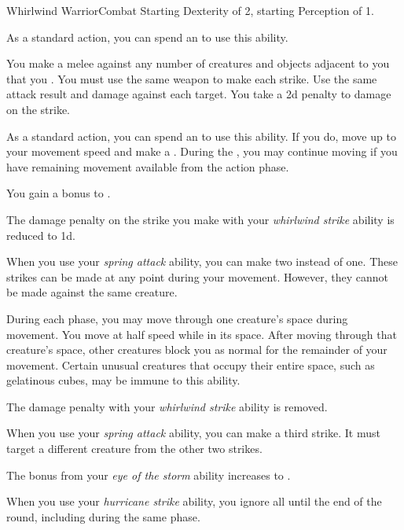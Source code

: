     \begin{feat}{Whirlwind Warrior}{Combat}
        \featpres Starting Dexterity of 2, starting Perception of 1.
        \featben

         As a standard action, you can spend an  to use this ability.
        \begin{ability}
            \begin{spelleffects}
                \spelleffect You make a melee  against any number of creatures and objects adjacent to you that you .
                You must use the same weapon to make each strike.
                Use the same attack result and damage against each target.
                You take a \minus2d penalty to damage on the strike.
            \end{spelleffects}
        \end{ability}

         As a standard action, you can spend an  to use this ability.
        If you do, move up to your movement speed and make a .
        During the , you may continue moving if you have remaining movement available from the action phase.

         You gain a  bonus to .

         The damage penalty on the strike you make with your \textit{whirlwind strike} ability is reduced to \minus1d.

         When you use your \textit{spring attack} ability, you can make two  instead of one.
        These strikes can be made at any point during your movement.
        However, they cannot be made against the same creature.

         During each phase, you may move through one creature's space during movement.
        You move at half speed while in its space.
        After moving through that creature's space, other creatures block you as normal for the remainder of your movement.
        Certain unusual creatures that occupy their entire space, such as gelatinous cubes, may be immune to this ability.

         The damage penalty with your \textit{whirlwind strike} ability is removed.

         When you use your \textit{spring attack} ability, you can make a third strike.
        It must target a different creature from the other two strikes.

         The bonus from your \textit{eye of the storm} ability increases to .

         When you use your \textit{hurricane strike} ability, you ignore all  until the end of the round, including during the same phase.
    \end{feat}


